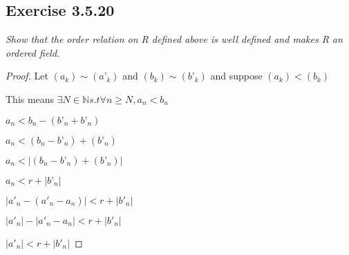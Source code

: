 \documentclass[12pt, a4paper]{article}
\begin{document}
        \subsection*{Exercise 3.5.20}
            \textit{Show that the order relation on R defined above is well defined and makes R an ordered field.}
            \begin{proof}
                Let $(a_k) \sim (a’_k)$ and $(b_k) \sim (b’_k)$ and suppose $(a_k) < (b_k)$

                This means $\exists N \in \mathbb{N} s.t \forall n\ge N, a_n < b_n$
                
                $a_n  < b_n-(b’_n+b’_n)$

                $a_n  < (b_n-b’_n)+(b’_n)$

                $a_n  < |(b_n-b’_n)+(b’_n)|$

                $a_n < r + |b’_n|$

                $|a'_n-(a'_n-a_n)| < r + |b'_n|$

                $|a'_n| - |a'_n-a_n| < r + |b'_n|$

                $|a'_n| < r + |b'_n|$ 
            \end{proof}
\end{document}
